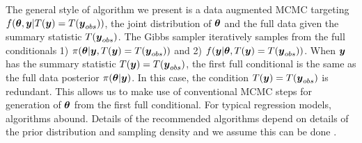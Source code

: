 \documentclass[ba]{imsart}
\def\bth{\mbox{\boldmath $\theta$}}
\newcommand{\by}{\mbox{\boldmath $y$}}
\begin{document}

The general style of algorithm we present is a data augmented
MCMC targeting $f(\bth, \by |
T(\by)=T(\by_{obs}))$, the joint distribution of $\bth$ and the full
data given the summary statistic $T(\by_{obs})$. 
 The Gibbs sampler \citep{gelfand1990} iteratively samples from the
 full conditionals 1) $\pi(\bth|\by, T(\by)=T(\by_{obs}))$ and 2) $f(\by|\bth, T(\by)=T(\by_{obs}))$.  When $\by$ has the summary statistic $T(\by) = T(\by_{obs})$,
the first full conditional is the same as the full data posterior $\pi(\bth|\by)$. In this case, the condition $T(\by) = T(\by_{obs})$ is redundant.  This allows us to make use of conventional MCMC steps for generation of $\bth$ from the first full conditional.  For typical regression models, algorithms abound. Details of the recommended algorithms depend on details of
the prior distribution and sampling density and we assume this can be done \citep[see e.g.,][]{liu1994, liang2008}.  
\end{document}
